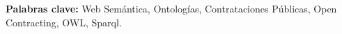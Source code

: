 \begin{resumen}


    
\textbf{Palabras clave:} Web Semántica,  Ontologías, Contrataciones Públicas, Open Contracting, OWL, Sparql.
\end{resumen}


